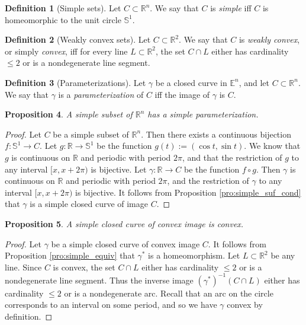 \documentclass{amsart}
\newtheorem{proposition}{Proposition}[section]
\theoremstyle{definition}
\newtheorem{definition}[proposition]{Definition}
\theoremstyle{remark}
\begin{document}
\begin{definition}[Simple sets]
    Let $C\subset\mathbb{R}^n$.
    We say that $C$ is \emph{simple}
    iff $C$ is homeomorphic to
    the unit circle $\mathbb{S}^1$.
\end{definition}

\begin{definition}[Weakly convex sets]
    Let $C\subset\mathbb{R}^2$. We say that $C$ is
    \emph{weakly convex}, or simply \emph{convex},
    iff for every line $L\subset\mathbb{R}^2$, the set $C\cap L$
    either has cardinality $\le2$ or is a nondegenerate line segment.
\end{definition}

\begin{definition}[Parameterizations]
    Let $\gamma$ be a closed curve in $\mathbb{E}^n$,
    and let $C\subset\mathbb{R}^n$.
    We say that $\gamma$ is
    a \emph{parameterization} of $C$ iff the image of $\gamma$
    is $C$.
\end{definition}

\begin{proposition}
    \label{pro:simple_par}
    A simple subset of $\mathbb{R}^n$ has
    a simple parameterization.
\end{proposition}

\begin{proof}
    Let $C$ be a simple subset of $\mathbb{R}^n$.
    Then there exists a continuous bijection $f:\mathbb{S}^1\to C$.
    Let $g:\mathbb{R}\to\mathbb{S}^1$ be the function
    $g(t):=(\cos t,\sin t)$. We know that $g$ is continuous
    on $\mathbb{R}$ and periodic with period $2\pi$, and that
    the restriction of $g$ to any interval $[x,x+2\pi)$
    is bijective. Let $\gamma:\mathbb{R}\to C$ be the function
    $f\circ g$. Then $\gamma$ is continuous
    on $\mathbb{R}$ and periodic with period $2\pi$, and the
    restriction of $\gamma$ to any interval $[x,x+2\pi)$ is bijective. It follows from Proposition \ref{pro:simple_suf_cond}
    that $\gamma$ is a simple closed curve of image $C$.
\end{proof}

\begin{proposition}
    \label{pro:simple_convex}
    A simple closed curve of convex image is convex.
\end{proposition}

\begin{proof}
    Let $\gamma$ be a simple closed curve of convex image $C$.
    It follows from Proposition \ref{pro:simple_equiv}
    that $\gamma^*$ is a homeomorphism.
    Let $L\subset\mathbb{R}^2$ be any line.
    Since $C$ is convex, the set $C\cap L$
    either has cardinality $\le2$ or is a nondegenerate line segment.
    Thus the inverse image $(\gamma^*)^{-1}(C\cap L)$
    either has cardinality $\le2$ or is a nondegenerate arc.
    Recall that an arc on the circle corresponds to an interval
    on some period, and so we have $\gamma$ convex by definition.
\end{proof}
\end{document}
